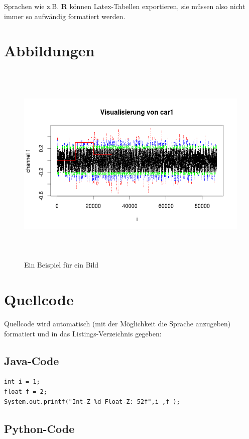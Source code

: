Sprachen wie z.B. \textbf{R} können Latex-Tabellen exportieren, sie müssen also nicht immer so aufwändig formatiert werden.			


\section{Abbildungen}

\begin{figure}[H]
	\hspace*{-1.5cm}
	\includegraphics[width=512pt,height=280pt]{figures/bsp.png}
	\caption{Ein Beispiel für ein Bild}
	\label{bild:beispiel}
\end{figure}


\section{Quellcode}

Quellcode wird automatisch (mit der Möglichkeit die Sprache anzugeben) formatiert und in das Listings-Verzeichnis gegeben:

\subsection{Java-Code}

\begin{lstlisting}[style=Java, caption={Java-Beispiel}, captionpos=b]
int i = 1;
float f = 2;
System.out.printf("Int-Z %d Float-Z: 52f",i ,f );
\end{lstlisting} 


\subsection{Python-Code}

